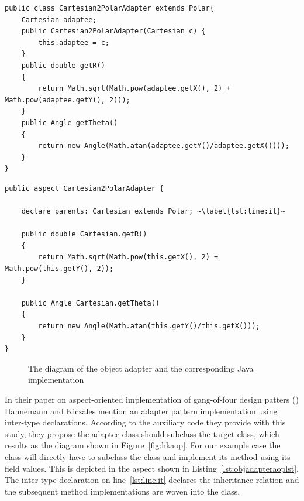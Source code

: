 \newsavebox{\cartesiantopolar}
\begin{lrbox}{\cartesiantopolar}
\begin{lstlisting}
public class Cartesian2PolarAdapter extends Polar{
	Cartesian adaptee;
	public Cartesian2PolarAdapter(Cartesian c) {
		this.adaptee = c;
	}
	public double getR()
	{
		return Math.sqrt(Math.pow(adaptee.getX(), 2) + Math.pow(adaptee.getY(), 2)));
	}
	public Angle getTheta()
	{
		return new Angle(Math.atan(adaptee.getY()/adaptee.getX())));
	}
}
	\end{lstlisting}
\end{lrbox}

\newsavebox{\cartesiantopolaraop}
\begin{lrbox}{\cartesiantopolaraop}
\begin{lstlisting}
public aspect Cartesian2PolarAdapter {

	declare parents: Cartesian extends Polar; ~\label{lst:line:it}~

	public double Cartesian.getR()
	{
		return Math.sqrt(Math.pow(this.getX(), 2) + Math.pow(this.getY(), 2));
	}
	
	public Angle Cartesian.getTheta()
	{
		return new Angle(Math.atan(this.getY()/this.getX()));
	}
}

	\end{lstlisting}
\end{lrbox}


\begin{figure}
\centering
{}
\hfill
{}
\vfill
{}
\caption{The diagram of the object adapter and the corresponding Java implementation}
\end{figure}

In their paper on aspect-oriented implementation of gang-of-four design patters (\cite{hannemann:oopsla02}) Hannemann and Kiczales mention an adapter pattern implementation using inter-type declarations. 
According to the auxiliary code they provide with this study, they propose the adaptee class should subclass the target class, which results as the diagram shown in Figure~\ref{fig:hkaop}. For our example case the  class will directly have to subclass the  class and implement its method using its  field values. This is depicted in the aspect shown in Listing~\ref{lst:objadapteraoplst}. The inter-type declaration on line~\ref{lst:line:it} declares the inheritance relation and the subsequent method implementations are woven into the  class.


